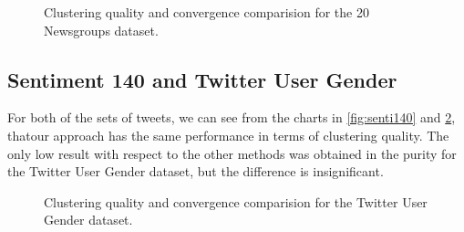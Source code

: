 \documentclass[runningheads]{llncs}
\begin{document}
\begin{figure}[H]
\caption{Clustering quality and convergence comparision for the 20 Newsgroups dataset.}
\label{fig:20newres}
\end{figure}

\subsection{Sentiment 140 and Twitter User Gender}
For both of the sets of tweets, we can see from the 
charts in \ref{fig:senti140} and \ref{fig:twittergender},
thatour approach has the same performance in terms of clustering quality. The only low result with respect to the other methods
was obtained in the purity for the Twitter User Gender dataset,
but the difference is insignificant.


\begin{figure}[H]
\centering
{}
\caption{Clustering quality and convergence comparision for the Twitter
User Gender dataset.}
\label{fig:twittergender}
\end{figure}    
\end{document}
